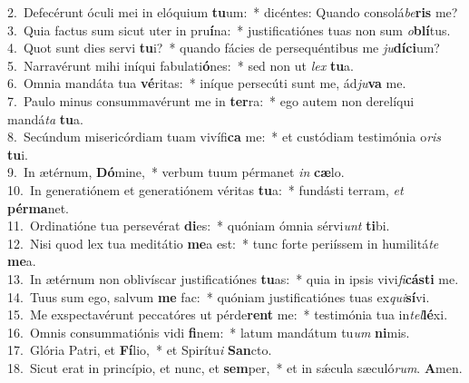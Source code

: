 {2.~}Defecérunt óculi mei in elóquium \textbf{tu}um:~* dicéntes: Quando consolá\textit{be}\textbf{ris} me?\\
{3.~}Quia factus sum sicut uter in pru\textbf{í}na:~* justificatiónes tuas non sum \textit{o}\textbf{blí}tus.\\
{4.~}Quot sunt dies servi \textbf{tu}i?~* quando fácies de persequéntibus me \textit{ju}\textbf{dí}\textbf{ci}um?\\
{5.~}Narravérunt mihi iníqui fabulati\textbf{ó}nes:~* sed non ut \textit{lex} \textbf{tu}a.\\
{6.~}Omnia mandáta tua \textbf{vé}ritas:~* iníque persecúti sunt me, ád\textit{ju}\textbf{va} me.\\
{7.~}Paulo minus consummavérunt me in \textbf{ter}ra:~* ego autem non derelíqui mandá\textit{ta} \textbf{tu}a.\\
{8.~}Secúndum misericórdiam tuam vivífi\textbf{ca} me:~* et custódiam testimónia o\textit{ris} \textbf{tu}i.\\
{9.~}In ætérnum, \textbf{Dó}mine,~* verbum tuum pérmanet \textit{in} \textbf{cæ}lo.\\
{10.~}In generatiónem et generatiónem véritas \textbf{tu}a:~* fundásti terram, \textit{et} \textbf{pér}\textbf{ma}net.\\
{11.~}Ordinatióne tua persevérat \textbf{di}es:~* quóniam ómnia sérvi\textit{unt} \textbf{ti}bi.\\
{12.~}Nisi quod lex tua meditátio \textbf{me}a est:~* tunc forte periíssem in humilitá\textit{te} \textbf{me}a.\\
{13.~}In ætérnum non oblivíscar justificatiónes \textbf{tu}as:~* quia in ipsis vivi\textit{fi}\textbf{cá}\textbf{sti} me.\\
{14.~}Tuus sum ego, salvum \textbf{me} fac:~* quóniam justificatiónes tuas ex\textit{qui}\textbf{sí}vi.\\
{15.~}Me exspectavérunt peccatóres ut pérde\textbf{rent} me:~* testimónia tua in\textit{tel}\textbf{lé}xi.\\
{16.~}Omnis consummatiónis vidi \textbf{fi}nem:~* latum mandátum tu\textit{um} \textbf{ni}mis.\\
{17.~}Glória Patri, et \textbf{Fí}lio,~* et Spirítu\textit{i} \textbf{San}cto.\\
{18.~}Sicut erat in princípio, et nunc, et \textbf{sem}per,~* et in sǽcula sæculó\textit{rum}. \textbf{A}men.\\
